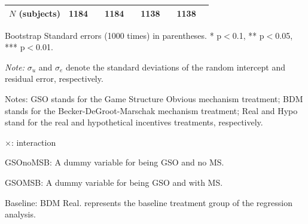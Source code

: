 \documentclass[12pt]{article}
\begin{document}
\begin{table}[H]
{\begin{tabular}{l*{4}{cc}}
\(N \) (subjects)      &        1184         &            &        1184         &            &        1138         &            &        1138         &            \\
\hline \hline
\end{tabular}
}




\begin{tablenotes}
            \footnotesize
           \item Bootstrap Standard errors (1000 times) in parentheses. * p$<$0.1, ** p$<$0.05, *** p$<$0.01.
            \item \textit{Note:} $\sigma_u$ and $\sigma_e$ denote the standard deviations of the random intercept and residual error, respectively.
            \item Notes: GSO stands for the Game Structure Obvious mechanism treatment; BDM stands for the Becker-DeGroot-Marschak mechanism treatment; Real and Hypo stand for the real and hypothetical incentives treatments, respectively.
           \item $\times$: interaction
           \item GSOnoMSB: A dummy variable for being GSO and no MS.
           \item GSOMSB: A dummy variable for being GSO and with MS.
           \item Baseline: BDM Real. represents the baseline treatment group of the regression analysis.
        \end{tablenotes}
            \end{table}

\clearpage
\end{document}
